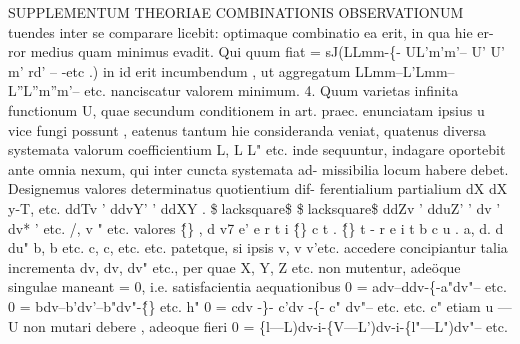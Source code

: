\documentclass[12pt,a4paper]{article}
\begin{document}
 SUPPLEMENTUM THEORIAE COMBINATIONIS OBSERVATIONUM
tuendes inter se comparare licebit: optimaque combinatio ea erit, in qua hie er-
ror medius quam minimus evadit. Qui quum fiat
= sJ(LLmm-\{- UL'm'm'-- U' U' m' rd' -- -etc .)
in id erit incumbendum , ut aggregatum LLmm--L'Lmm--L''L''m''m'-- etc.
nanciscatur valorem minimum.
4.
Quum varietas infinita functionum U, quae secundum conditionem in art.
praec. enunciatam ipsius u vice fungi possunt , eatenus tantum hie consideranda
veniat, quatenus diversa systemata valorum coefficientium L, L L" etc. inde
sequuntur, indagare oportebit ante omnia nexum, qui inter cuncta systemata ad-
missibilia locum habere debet. Designemus valores determinatus quotientium dif-
ferentialium partialium
dX dX
y-T, etc.
ddTv ' ddvY' ' ddXY . \$lacksquare\$ \$lacksquare\$
ddZv ' dduZ' '
dv ' dv*
' etc.
/, v " etc. valores \^\{\} , d v7 e' e r t i \^\{\} c t . \^\{\} t - r e i t b c u .
a, d. d du"
b, b etc.
c, c,
etc. etc.
patetque, si ipsis v, v v'etc. accedere concipiantur talia incrementa dv, dv, dv"
etc., per quae X, Y, Z etc. non mutentur, adeöque singulae maneant = 0, i.e.
satisfacientia aequationibus
0 = adv--ddv-\{-a"dv"-- etc.
0 = bdv--b'dv'--b"dv"-\^\{\} etc. h"
0 = cdv -\}- c'dv -\{- c" dv"-- etc. etc. c"
etiam u --- U non mutari debere , adeoque fieri
0 = \{l---L)dv-i-\{V---L')dv-i-\{l"---L")dv"-- etc.
\end{document}
